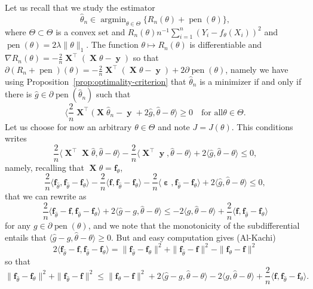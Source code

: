 \documentclass[
	fontsize=11pt, %
	twoside=false, %
	numbers=noenddot, %
]{kaobook}
\DeclareMathOperator{\bX}{{\boldsymbol X}}
\renewcommand{\bf}{{\boldsymbol f}}
\DeclareMathOperator{\by}{{\boldsymbol y}}
\DeclareMathOperator{\beps}{\boldsymbol \varepsilon}
\DeclareMathOperator{\pen}{pen}
\DeclareMathOperator*{\argmin}{argmin}
\newcommand{\wh}{\widehat}
\newcommand{\grad}{\nabla}
\newcommand{\norm}[1]{\| #1 \|}
\newcommand{\inr}[1]{\langle #1 \rangle}
\begin{document}
Let us recall that we study the estimator
\begin{equation*}
	\wh \theta_n \in \argmin_{\theta \in \Theta} \big\{ R_n(\theta) + \pen(\theta) \big\},
\end{equation*}
where $\Theta \subset \Theta$ is a convex set and $R_n(\theta) n^{-1} \sum_{i=1}^n (Y_i - f_\theta(X_i))^2$ and $\pen(\theta) = 2 \lambda \norm{\theta}_1$.
The function $\theta \mapsto R_n(\theta)$ is differentiable and $\grad R_n(\theta) = - \frac 2n \bX^\top (\bX \theta - \by)$ so that $\partial(R_n + \pen)(\theta) = - \frac 2n \bX^\top (\bX \theta - \by) + 2\partial \pen(\theta)$, namely we have using Proposition~\ref{prop:optimality-criterion} that $\wh \theta_n$ is a minimizer if and only if there is $\wh g \in \partial \pen(\wh \theta_n)$ such that
\begin{equation}
	\Big \langle \frac 2n \bX^\top (\bX \wh \theta_n - \by + 2 \wh g, \wh \theta - \theta \Big \rangle \geq 0 \quad \text{for all} \theta \in \Theta.
\end{equation}
Let us choose for now an arbitrary $\theta \in \Theta$ and note $J = J(\theta)$.
This conditions writes
\begin{equation*}
	\frac 2n \big \langle  \bX^\top \bX \wh \theta, \wh \theta - \theta \big \rangle 
	- \frac 2n \big \langle \bX^\top \by, \wh \theta - \theta \big \rangle
	+ 2 \inr{\wh g, \wh \theta - \theta} \leq 0,
\end{equation*}
namely, recalling that $\bX \theta = \bf_\theta$, 
\begin{equation*}
	\frac 2n \langle \bf_{\wh \theta}, \bf_{\wh \theta} - \bf_{\theta} \rangle 
	- \frac 2n  \inr{\bf,  \bf_{\wh \theta} - \bf_\theta} 
	- \frac 2n \inr{\beps, \bf_{\wh \theta} - \bf_\theta}
	+ 2 \inr{\wh g, \wh \theta - \theta} \leq 0,
\end{equation*}
that we can rewrite as 
\begin{equation*}
	\frac 2n \inr{ \bf_{\wh \theta} - \bf, \bf_{\wh \theta} - \bf_{\theta}}
	+ 2 \inr{\wh g - g, \wh \theta - \theta} 
	\leq - 2 \inr{g, \wh \theta - \theta} 
	+ \frac 2n  \inr{\bf,  \bf_{\wh \theta} - \bf_\theta} 
\end{equation*}
for any $g \in \partial \pen(\theta)$, and we note that the monotonicity of the subdifferential entails that $\inr{\wh g - g, \wh \theta - \theta} \geq 0$.
But and easy computation gives (Al-Kachi)
\begin{equation*}
	2 \inr{ \bf_{\wh \theta} - \bf, \bf_{\wh \theta} - \bf_{\theta}} 
	= \norm{\bf_{\wh \theta} - \bf_{\theta}}^2 
	+ \norm{\bf_{\wh \theta} - \bf}^2
	- \norm{\bf_{\theta} - \bf}^2
\end{equation*}
so that
\begin{equation*}
	\norm{\bf_{\wh \theta} - \bf_{\theta}}^2 + \norm{\bf_{\wh \theta} - \bf}^2 
	\leq \norm{\bf_{\theta} - \bf}^2
	+ 2 \inr{\wh g - g, \wh \theta - \theta} 
    - 2 \inr{g, \wh \theta - \theta} 
	+ \frac 2n  \inr{\bf,  \bf_{\wh \theta} - \bf_\theta}.
\end{equation*}
\end{document}
